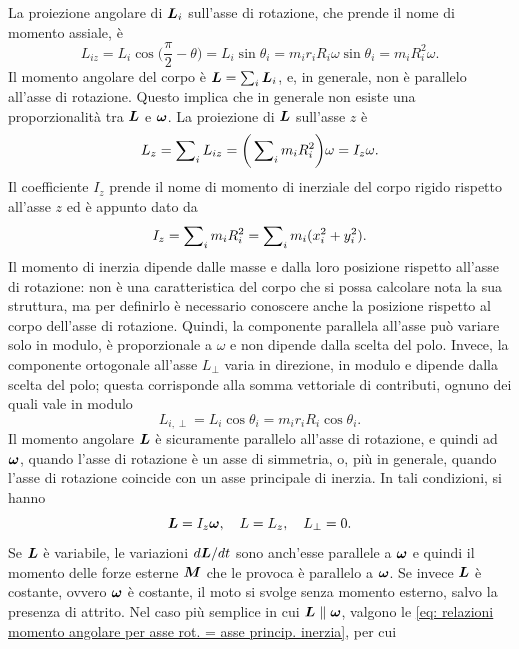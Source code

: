 La proiezione angolare di $\bm{L}_i$ sull'asse di rotazione, che prende il nome di momento assiale, è
\begin{equation}
    L_{iz}=L_i\cos{\bigg(\frac{\pi}{2}-\theta\bigg)}=L_i\sin{\theta_i}=m_ir_iR_i\omega\sin{\theta_i}=m_iR_i^2\omega.
\end{equation}
Il momento angolare del corpo è $\bm{L}=\sum_i\bm{L}_i$, e, in generale, non è parallelo all'asse di rotazione. Questo implica che in generale non esiste una proporzionalità tra $\bm{L}$ e $\bm{\omega}$. La proiezione di $\bm{L}$ sull'asse $z$ è
\begin{equation}
    L_z=\sum\nolimits_iL_{iz}=\bigg(\sum\nolimits_im_iR_i^2\bigg)\omega=I_z\omega.
\end{equation}
Il coefficiente $I_z$ prende il nome di momento di inerziale del corpo rigido rispetto all'asse $z$ ed è appunto dato da
\begin{equation}
\label{eq: momento di inerzia discreto}
    I_z=\sum\nolimits_im_iR_i^2=\sum\nolimits_im_i(x_i^2+y_i^2).
\end{equation}
Il momento di inerzia dipende dalle masse e dalla loro posizione rispetto all'asse di rotazione: non è una caratteristica del corpo che si possa calcolare nota la sua struttura, ma per definirlo è necessario conoscere anche la posizione rispetto al corpo dell'asse di rotazione. Quindi, la componente parallela all'asse può variare solo in modulo, è proporzionale a $\omega$ e non dipende dalla scelta del polo. Invece, la componente ortogonale all'asse $L_\perp$ varia in direzione, in modulo e dipende dalla scelta del polo; questa corrisponde alla somma vettoriale di contributi, ognuno dei quali vale in modulo
\begin{equation}
    L_{i,\perp}=L_i\cos{\theta_i}=m_ir_iR_i\cos{\theta_i}.
\end{equation}
Il momento angolare $\bm{L}$ è sicuramente parallelo all'asse di rotazione, e quindi ad $\bm{\omega}$, quando l'asse di rotazione è un asse di simmetria, o, più in generale, quando l'asse di rotazione coincide con un asse principale di inerzia. In tali condizioni, si hanno
\begin{equation}
\label{eq: relazioni momento angolare per asse rot. = asse princip. inerzia}
    \bm{L}=I_z\bm{\omega},\quad L=L_z,\quad L_\perp=0.
\end{equation}
Se $\bm{L}$ è variabile, le variazioni $d\bm{L}/dt$ sono anch'esse parallele a $\bm{\omega}$ e quindi il momento delle forze esterne $\bm{M}$ che le provoca è parallelo a $\bm{\omega}$. Se invece $\bm{L}$ è costante, ovvero $\bm{\omega}$ è costante, il moto si svolge senza momento esterno, salvo la presenza di attrito. Nel caso più semplice in cui $\bm{L}\parallel\bm{\omega}$, valgono le \eqref{eq: relazioni momento angolare per asse rot. = asse princip. inerzia}, per cui
